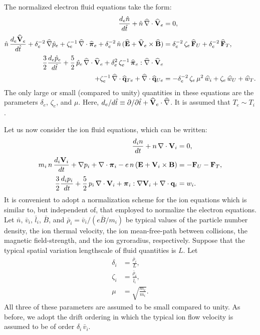 \documentclass[notitlepage,12pt]{article}
\newcommand{\bpi}{\mbox{\boldmath$\pi$}}
\begin{document}
The normalized electron fluid equations take the form:
\begin{align}
\frac{d_e \hat{n}}{d\hat{t}} + \hat{n}\,\widehat{\nabla}\cdot\widehat{\bf V}_e &=0,\label{e3.113a}\\[0.5ex]
\hat{n}\,\frac{d_e \widehat{\bf V}_e}{d\hat{t}} +
\delta_e^{-2}\,\widehat{\nabla}\hat{p}_e +\zeta_e^{-1}\,\widehat{\nabla}
\cdot\widehat{\bpi}_e  
+ \delta_e^{-2}\,\hat{n}\,(\widehat{\bf E} + \widehat{\bf V}_e
\times\widehat{\bf B}) &= \delta_e^{-2}\,\zeta_e\,\widehat{\bf F}_U +\delta_e^{-2}\,\widehat{\bf F}_T, \\[0.5ex]
\frac{3}{2}\frac{d_e \hat{p}_e}{d\hat{t}} + \frac{5}{2}\,
\hat{p}_e\,\widehat{\nabla}\cdot\widehat{\bf V}_e + \delta_e^{2}\,
\zeta_e^{-1}\,\widehat{\bpi}_e : \widehat{\nabla}\cdot\widehat{\bf V}_e&\nonumber\label{e3.113c}\\[0.5ex] 
+\zeta_e^{-1} \,\widehat{\nabla}\cdot\widehat{\bf q}_{Te}
 +\widehat{\nabla}\cdot\widehat{\bf q}_{Ue} 
&= -\delta_e^{-2}\,\zeta_e\,\mu^2\,\widehat{w}_i + \zeta_e\,
\widehat{w}_U +\widehat{w}_T.
\end{align}
The only large or small (compared to unity) quantities in these equations are the
parameters $\delta_e$, $\zeta_e$, and $\mu$. 
Here, $d_e/d\hat{t}\equiv\partial /\partial\hat{t} +
 \widehat{\bf V}_e\cdot\widehat{\nabla}$. It is assumed that $T_e\sim T_i$.

Let us now consider the ion fluid equations, which can be written:
\begin{align}
\frac{d_i n}{dt} + n\,\nabla\cdot{\bf V}_i &= 0,\\[0.5ex]
m_i\, n\,\frac{d_i {\bf V}_i}{dt} + \nabla p_i + \nabla\cdot \bpi_i - e\, n\,
({\bf E} + {\bf V}_i\times {\bf B})& =- {\bf F}_U -{\bf F}_T,\\[0.5ex]
\frac{3}{2}\frac{d_i p_i}{dt} + \frac{5}{2}\,p_i\,\nabla \cdot {\bf V}_i
+ \bpi_i:\nabla{\bf V}_i+ \nabla\cdot{\bf q}_i & =w_i.
\end{align}
It is convenient to adopt a normalization scheme for the ion equations
which is similar to, but independent of, that employed to normalize the
electron equations. Let  $\bar{n}$, $\bar{v}_i$, $\bar{l}_i$, $\bar{B}$,
and $\bar{\rho}_i =\bar{ v}_i/(e\bar{B}/m_i)$  be typical values
of the particle number density, the ion  thermal velocity, the ion
mean-free-path between collisions,  the magnetic field-strength, and the
ion gyroradius,  respectively. 
Suppose that 
the typical spatial variation lengthscale of fluid quantities is $L$. Let
 \begin{align}
\delta_i &= \frac{\bar{\rho}_i}{L},\\[0.5ex]
\zeta_i &= \frac{\bar{\rho}_i}{\bar{l}_i},\\[0.5ex]
\mu &= \sqrt{\frac{m_e}{m_i}}.
\end{align}
All three of these parameters are assumed to be  small 
compared to unity.  As before, we adopt the drift ordering in which the typical ion flow velocity is assumed to be of order $\delta_i\,\bar{v}_i$. 
\end{document}
